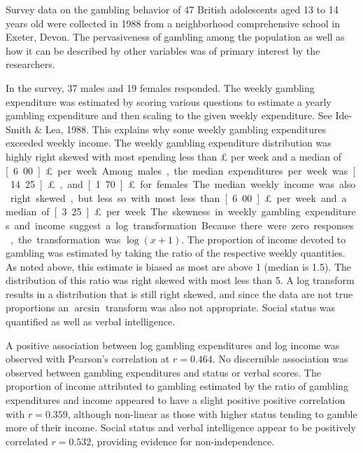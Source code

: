 \documentclass{homework}
\begin{document}
  \begin{solution}
  Survey data on the gambling behavior of 47 British adolescents aged 13 to 14
  years old were collected in 1988 from a neighborhood comprehensive school in
  Exeter, Devon.  The pervasiveness of gambling among the population as well as
  how it can be described by other variables was of primary interest by the
  researchers. 

  In the survey, 37 males and 19 females responded. The weekly gambling
  expenditure was estimated by scoring various questions to estimate a yearly
  gambling expenditure and then scaling to the given weekly expenditure.  See
  Ide-Smith \& Lea, 1988.  This explains why some weekly gambling expenditures
  exceeded weekly income.  The weekly gambling expenditure distribution was
  highly right skewed with most spending less than \unit[10]{\pounds} per week
  and a median of \unit[6.00]{\pounds} per week. Among males, the median
  expenditures per week was \unit[14.25]{\pounds}, and \unit[1.70]{\pounds} for
  females. The median weekly income was also right skewed, but less so with
  most less than \unit[6.00]{\pounds} per week and a median of
  \unit[3.25]{\pounds} per week.  The skewness in weekly gambling expenditures
  and income suggest a log transformation.  Because there were zero responses,
  the transformation was $\log(x+1)$. The proportion of income devoted to 
  gambling was estimated by taking the ratio of the respective weekly quantities.
  As noted above, this estimate is biased as most are above 1 (median is 1.5).
  The distribution of this ratio was right skewed with most less than 5. A log
  transform results in a distribution that is still right skewed, and 
  since the data are not true proportions an $\arcsin$ transform was also
  not appropriate.  Social status was quantified as well as verbal intelligence.

  A positive association between log gambling expenditures and log income was
  observed with Pearson's correlation at $r=0.464$.  No discernible association
  was observed between gambling expenditures and status or verbal scores.  The
  proportion of income attributed to gambling estimated by the ratio of
  gambling expenditures and income appeared to have a slight positive positive
  correlation with $r=0.359$, although non-linear as those with higher status
  tending to gamble more of their income.  Social status and verbal intelligence
  appear to be positively correlated $r=0.532$, providing evidence for non-independence. 


\end{solution}
\end{document}
